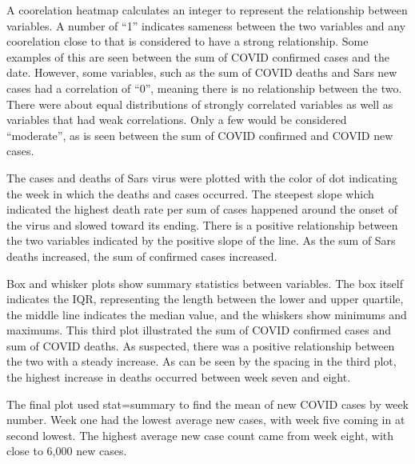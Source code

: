 \documentclass[
]{article}
\begin{document}
A coorelation heatmap calculates an integer to represent the
relationship between variables. A number of ``1'' indicates sameness
between the two variables and any coorelation close to that is
considered to have a strong relationship. Some examples of this are seen
between the sum of COVID confirmed cases and the date. However, some
variables, such as the sum of COVID deaths and Sars new cases had a
correlation of ``0'', meaning there is no relationship between the two.
There were about equal distributions of strongly correlated variables as
well as variables that had weak correlations. Only a few would be
considered ``moderate'', as is seen between the sum of COVID confirmed
and COVID new cases.

The cases and deaths of Sars virus were plotted with the color of dot
indicating the week in which the deaths and cases occurred. The steepest
slope which indicated the highest death rate per sum of cases happened
around the onset of the virus and slowed toward its ending. There is a
positive relationship between the two variables indicated by the
positive slope of the line. As the sum of Sars deaths increased, the sum
of confirmed cases increased.

Box and whisker plots show summary statistics between variables. The box
itself indicates the IQR, representing the length between the lower and
upper quartile, the middle line indicates the median value, and the
whiskers show minimums and maximums. This third plot illustrated the sum
of COVID confirmed cases and sum of COVID deaths. As suspected, there
was a positive relationship between the two with a steady increase. As
can be seen by the spacing in the third plot, the highest increase in
deaths occurred between week seven and eight.

The final plot used stat=summary to find the mean of new COVID cases by
week number. Week one had the lowest average new cases, with week five
coming in at second lowest. The highest average new case count came from
week eight, with close to 6,000 new cases.
\end{document}
